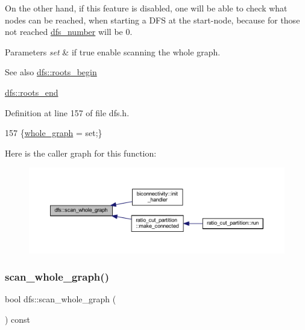 On the other hand, if this feature is disabled, one will be able to check what nodes can be reached, when starting a D\+FS at the start-\/node, because for those not reached \mbox{\hyperlink{classdfs_a99727f2274d6af63daae4f0518f3adbe}{dfs\+\_\+number}} will be 0.


\begin{DoxyParams}{Parameters}
{\em set} & if true enable scanning the whole graph. \\
\hline
\end{DoxyParams}
\begin{DoxySeeAlso}{See also}
\mbox{\hyperlink{classdfs_af56fa2b736f0b924dba1257e18ba4b61}{dfs\+::roots\+\_\+begin}} 

\mbox{\hyperlink{classdfs_ae1a61d8c2d8d99059cab410f766ec73f}{dfs\+::roots\+\_\+end}} 
\end{DoxySeeAlso}


Definition at line 157 of file dfs.\+h.


\begin{DoxyCode}
157 \{\mbox{\hyperlink{classdfs_ab8342c80ab208ef0e0d781f0769d0d95}{whole\_graph}} = \textcolor{keyword}{set};\}
\end{DoxyCode}
Here is the caller graph for this function\+:
\nopagebreak
\begin{figure}[H]
\begin{center}
\leavevmode
\includegraphics[width=350pt]{classdfs_aa7c864a6f3a120720138b187b3ed95b5_icgraph}
\end{center}
\end{figure}
\mbox{\label{classdfs_a025ed2d6101a7b9f72578a52b484ef50}} 
\subsubsection{\texorpdfstring{scan\+\_\+whole\+\_\+graph()}{scan\_whole\_graph()}\hspace{0.1cm}{\footnotesize\ttfamily [2/2]}}
{\footnotesize\ttfamily bool dfs\+::scan\+\_\+whole\+\_\+graph (\begin{DoxyParamCaption}{ }\end{DoxyParamCaption}) const\hspace{0.3cm}{\ttfamily [inline]}}



